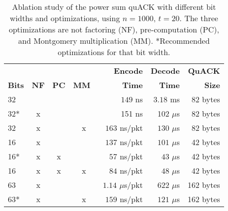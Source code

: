 \begin{table}[t]
  \centering
  \begin{tabular}{lcccrrr}
    \toprule
    \bf     & \bf        & \bf       & \bf        & \bf Encode & \bf Decode & \bf QuACK\\
    \bf Bits  & \bf NF     & \bf PC    & \bf MM~\cite{montgomery1985modular}     & \bf Time & \bf Time     & \bf Size\\
    \midrule
    32     &        &       &        & $149$ ns & $3.18$ ms      & 82 bytes \\
    \rowcolor{yellow}
    32* & x & & & 151 ns & 102 ${\mu}$s & 82 bytes \\
    32     & x      &       & x      & $163$ ns/pkt & $130$ ${\mu}$s & 82 bytes \\
    16     & x      &       &        & $137$ ns/pkt & $101$ ${\mu}$s & 42 bytes \\
    16*    & x      & x     &        & $57$ ns/pkt & $43$ ${\mu}$s & 42 bytes \\
    16     & x      & x     & x      & $84$ ns/pkt & $48$ ${\mu}$s & 42 bytes \\
    63     & x      &       &        & $1.14$ ${\mu}$s/pkt & $622$ ${\mu}$s & 162 bytes \\
    63*    & x      &       & x      & $159$ ns/pkt & $121$ ${\mu}$s & 162 bytes \\
    \bottomrule
  \end{tabular}
  \caption{Ablation study of the power sum quACK with different bit widths and optimizations,
  using $n=1000$, $t=20$. The three optimizations are not factoring (NF),
  pre-computation (PC), and Montgomery multiplication (MM).
  *Recommended optimizations for that bit width.}
  \label{tab:quack:optimized-quack}
\end{table}
